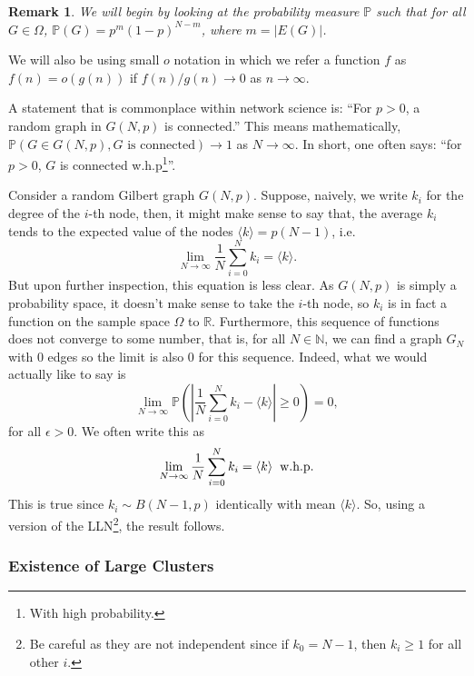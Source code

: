 \documentclass[
]{article}
\newtheorem*{remark}{Remark}
\theoremstyle{definition}
\begin{document}
\begin{remark}
  We will begin by looking at the probability measure \(\mathbb{P}\) such that 
  for all \(G \in \Omega\), \(\mathbb{P}(G) = p^m (1 - p)^{N - m}\), where 
  \(m = \left| E(G) \right|\).
\end{remark}

We will also be using small \(o\) notation in which we refer a function
\(f\) as \(f(n) = o(g(n))\) if \(f(n) / g(n) \to 0\) as
\(n \to \infty\).

A statement that is commonplace within network science is: ``For
\(p > 0\), a random graph in \(G(N, p)\) is connected.'' This means
mathematically,
\(\mathbb{P}(G \in G(N, p), G \text{ is connected}) \to 1\) as
\(N \to \infty\). In short, one often says: ``for \(p > 0\), \(G\) is
connected w.h.p\footnote{With high probability.}''.

Consider a random Gilbert graph \(G(N, p)\). Suppose, naively, we write
\(k_i\) for the degree of the \(i\)-th node, then, it might make sense
to say that, the average \(k_i\) tends to the expected value of the
nodes \(\langle k \rangle = p(N - 1)\), i.e.
\[\lim_{N \to \infty} \frac{1}{N} \sum_{i = 0}^N k_i = \langle k \rangle.\]
But upon further inspection, this equation is less clear. As \(G(N, p)\)
is simply a probability space, it doesn't make sense to take the
\(i\)-th node, so \(k_i\) is in fact a function on the sample space
\(\Omega\) to \(\mathbb{R}\). Furthermore, this sequence of functions
does not converge to some number, that is, for all \(N \in \mathbb{N}\),
we can find a graph \(G_N\) with \(0\) edges so the limit is also \(0\)
for this sequence. Indeed, what we would actually like to say is
\[\lim_{N \to \infty} \mathbb{P} \left( \left| \frac{1}{N}\sum_{i = 0}^N k_i - 
  \langle k \rangle \right| \ge 0 \right) = 0, \] for all
\(\epsilon > 0\). We often write this as
\[\lim_{N \to \infty} \frac{1}{N} \sum_{i = 0}^N k_i = \langle k \rangle 
  \hspace{2mm} \text{w.h.p}.\] This is true since
\(k_i \sim B(N - 1, p)\) identically with mean \(\langle k \rangle\).
So, using a version of the
LLN\footnote{Be careful as they are not independent 
since if \(k_0 = N - 1\), then \(k_i \ge 1\) for all other \(i\).}, the
result follows.

\hypertarget{existence-of-large-clusters}{%
\subsubsection{Existence of Large
Clusters}\label{existence-of-large-clusters}}
\end{document}
